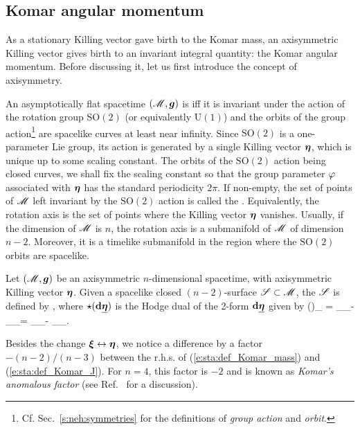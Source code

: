 \subsection{Komar angular momentum} \label{s:sta:Komar_angu_mom}

As a stationary Killing vector gave birth to the Komar mass,
an axisymmetric Killing vector gives birth to an invariant integral quantity:
the Komar angular momentum. Before discussing it, let us first introduce
the concept of axisymmetry.

An asymptotically flat spacetime $(\mathscr{M}, \bm{g})$ is  iff it is invariant
under the action of the rotation group $\mathrm{SO}(2)$ (or equivalently $\mathrm{U}(1)$)
and the orbits of the group action\footnote{Cf. Sec.~\ref{s:neh:symmetries} for the definitions of \emph{group action} and \emph{orbit}.} are spacelike curves at least near infinity.
Since $\mathrm{SO}(2)$ is a one-parameter Lie group, its action is generated by a single Killing vector $\bm{\eta}$,
which is unique up to some scaling constant.
The orbits of the $\mathrm{SO}(2)$ action being closed curves, we shall fix the scaling constant
so that the group parameter $\varphi$ associated with $\bm{\eta}$ has the standard periodicity $2\pi$.
If non-empty, the set of points of $\mathscr{M}$ left invariant by the $\mathrm{SO}(2)$ action is called the
. Equivalently, the rotation axis is the set of points
where the Killing vector $\bm{\eta}$ vanishes. Usually, if the dimension of $\mathscr{M}$ is $n$, the rotation
axis is a submanifold of $\mathscr{M}$ of dimension $n-2$. Moreover, it is a timelike submanifold in the region
where the $\mathrm{SO}(2)$ orbits are spacelike.


Let $(\mathscr{M}, \bm{g})$ be an axisymmetric $n$-dimensional spacetime,
with axisymmetric Killing vector $\bm{\eta}$.
Given a spacelike closed $(n-2)$-surface $\mathscr{S}\subset\mathscr{M}$,
the  $\mathscr{S}$ is
defined by
\be \label{e:sta:def_Komar_J}
     ,
\ee
where $\star(\mathbf{d} \underline{\bm{\eta}})$
is the Hodge dual of the 2-form $\mathbf{d} \underline{\bm{\eta}}$ given by
\be
    (\dd \uu{\eta})_{\alpha\beta} =
        \partial_\alpha \eta_\beta - \partial_\beta \eta_\alpha =
        \nabla_\alpha \eta_\beta - \nabla_\beta \eta_\alpha .
\ee

\begin{remark}
Besides the change $\bm{\xi}\leftrightarrow\bm{\eta}$, we notice a difference by a factor $-(n-2)/(n-3)$ between the r.h.s. of (\ref{e:sta:def_Komar_mass}) and (\ref{e:sta:def_Komar_J}). For $n=4$, this factor is $-2$ and is
known as \emph{Komar's anomalous factor} (see Ref.~\cite{Katz85} for a discussion).
\end{remark}


